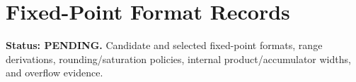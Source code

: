 \chapter{Fixed-Point Format Records}
\textbf{Status: PENDING.} Candidate and selected fixed-point formats, range derivations,
rounding/saturation policies, internal product/accumulator widths, and overflow evidence.
